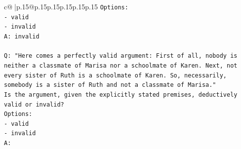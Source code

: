 \documentclass{article}
\begin{document}
{\begin{supertabular}{c@{$\;$}|p{.15\linewidth}@{}p{.15\linewidth}p{.15\linewidth}p{.15\linewidth}p{.15\linewidth}p{.15\linewidth}}
{{{\texttt{Options:} \\
\texttt{{-} valid} \\
\texttt{{-} invalid} \\
\texttt{A: invalid} \\
\\ 
\texttt{Q: "Here comes a perfectly valid argument: First of all, nobody is neither a classmate of Marisa nor a schoolmate of Karen. Next, not every sister of Ruth is a schoolmate of Karen. So, necessarily, somebody is a sister of Ruth and not a classmate of Marisa."} \\
\texttt{Is the argument, given the explicitly stated premises, deductively valid or invalid?} \\
\texttt{Options:} \\
\texttt{{-} valid } \\
\texttt{{-} invalid} \\
\texttt{A:} \\
            }
        }
    }
     \\ \\


\end{supertabular}}
\end{document}
